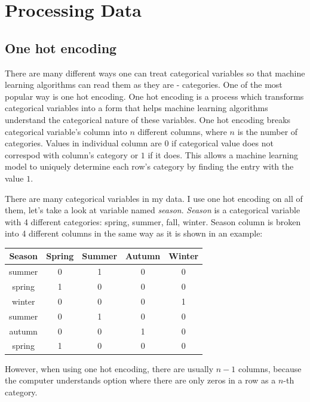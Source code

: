 \documentclass[12pt]{article}
\begin{document}
			
	\section{Processing Data}
	
	\subsection{One hot encoding}
	
	There are many different ways one can treat categorical variables so that machine learning algorithms can read them as they are - categories. One of the most popular way is one hot encoding. One hot encoding is a process which transforms categorical variables into a form that helps machine learning algorithms understand the categorical nature of these variables. One hot encoding breaks categorical variable's column into $n$ different columns, where $n$ is the number of categories. Values in individual column are $0$ if categorical value does not correspod with column's category or $1$ if it does. This allows a machine learning model to uniquely determine each row's category by finding the entry with the value $1$.
	
	There are many categorical variables in my data. I use one hot encoding on all of them, let's take a look at variable named \textit{season}. \textit{Season} is a categorical variable with 4 different categories: spring, summer, fall, winter. Season column is broken into 4 different columns in the same way as it is shown in an example:
	
	\begin{center}
		\begin{tabular}{ |c|c|c|c|c|  } 
			\hline
			\textbf{Season} & \textbf{Spring} & \textbf{Summer} & \textbf{Autumn} & \textbf{Winter} \\
			\hline
			\hline
			summer & 0 & 1 & 0 & 0 \\
			\hline
			spring & 1 & 0 & 0 & 0 \\
			\hline
			winter & 0 & 0 & 0 & 1 \\
			\hline
			summer & 0 & 1 & 0 & 0 \\
			\hline
			autumn & 0 & 0 & 1 & 0 \\
			\hline
			spring & 1 & 0 & 0 & 0 \\
			\hline
		\end{tabular}
	\end{center}

	However, when using one hot encoding, there are usually $n-1$ columns, because the computer understands option where there are only zeros in a row as a $n$-th category.
	
\end{document}

